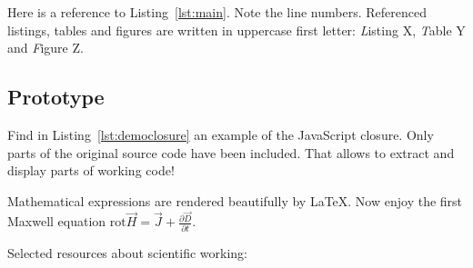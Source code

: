 Here is a reference to Listing~\ref{lst:main}. Note the line numbers. Referenced listings, tables and figures are written in uppercase first letter: \emph{L}isting X,  \emph{T}able Y and  \emph{F}igure Z.



\subsection{Prototype}

Find in Listing~\ref{lst:democlosure} an example of the JavaScript closure. Only parts of the original source code have been included. That allows to extract and display parts of working code!



Mathematical expressions are rendered beautifully by \LaTeX. Now enjoy the first Maxwell equation 
\begin{math} 
  \text{rot} \vec{H} = \vec{J} + \frac{\partial \vec{D}}{\partial t} 
\end{math}.

Selected resources about scientific working: 

